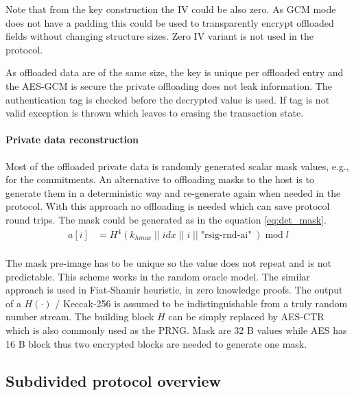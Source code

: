 \documentclass[]{article}
\begin{document}
Note that from the key construction the IV could be also zero. As GCM mode does not have a padding this could be used to transparently encrypt offloaded fields without changing structure sizes. Zero IV variant is not used in the protocol.

As offloaded data are of the same size, the key is unique per offloaded entry and the AES-GCM is secure the private offloading does not leak information. The authentication tag is checked before the decrypted value is used. If tag is not valid exception is thrown which leaves to erasing the transaction state.

\paragraph{Private data reconstruction} \label{mask_reconstruction}
Most of the offloaded private data is randomly generated scalar mask values, e.g., for the commitments. An alternative to offloading masks to the host is to generate them in a deterministic way and re-generate again when needed in the protocol. With this approach no offloading is needed which can save protocol round trips. The mask could be generated as in the equation \ref{eq:det_mask}. 
\begin{equation}
\begin{split} \label{eq:det_mask}
a[i] &= H^4(k_{hmac} \; || \; idx \; || \; i \; || \; \text{"rsig-rnd-ai"} \; ) \; \text{mod} \; l  \\
\end{split}
\end{equation}

The mask pre-image has to be unique so the value does not repeat and is not predictable. This scheme works in the random oracle model. The similar approach is used in Fiat-Shamir heuristic, in zero knowledge proofs. The output of a $H(\cdot)$ / Keccak-256 is assumed to be indistinguishable from a truly random number stream. The building block $H$ can be simply replaced by AES-CTR which is also commonly used as the PRNG. Mask are 32 B values while AES has 16 B block thus two encrypted blocks are needed to generate one mask. 

\subsection{Subdivided protocol overview}
\end{document}
